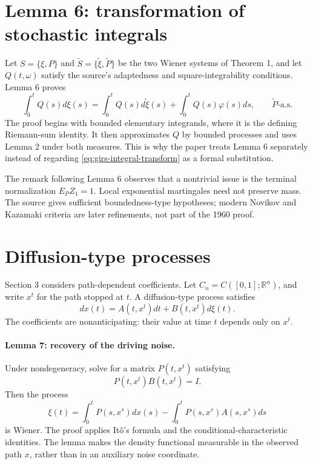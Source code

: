 \section{Lemma 6: transformation of stochastic integrals}
Let \(S=\{\xi,P\}\) and \(\widetilde S=\{\widetilde\xi,\widetilde P\}\) be the two Wiener systems of
Theorem 1, and let \(Q(t,\omega)\) satisfy the source's adaptedness and square-integrability
conditions.  Lemma 6 proves
\begin{equation}\label{eq:girs-integral-transform}
 \int_0^tQ(s)d\xi(s)
 =\int_0^tQ(s)d\widetilde\xi(s)+
   \int_0^tQ(s)\varphi(s)ds,
 \qquad \widetilde P\text{-a.s.}
\end{equation}
The proof begins with bounded elementary integrands, where it is the defining Riemann-sum identity.
It then approximates \(Q\) by bounded processes and uses Lemma 2 under both measures.  This is why
the paper treats Lemma 6 separately instead of regarding \eqref{eq:girs-integral-transform} as a
formal substitution.

The remark following Lemma 6 observes that a nontrivial issue is the terminal normalization
\(E_PZ_1=1\).  Local exponential martingales need not preserve mass.  The source gives sufficient
boundedness-type hypotheses; modern Novikov and Kazamaki criteria are later refinements, not part of
the 1960 proof.

\section{Diffusion-type processes}
Section 3 considers path-dependent coefficients.  Let \(C_n=C([0,1];\mathbb R^n)\), and write
\(x^t\) for the path stopped at \(t\).  A diffusion-type process satisfies
\begin{equation}\label{eq:girs-path-sde}
 dx(t)=A(t,x^t)dt+B(t,x^t)d\xi(t).
\end{equation}
The coefficients are nonanticipating: their value at time \(t\) depends only on \(x^t\).

\paragraph{Lemma 7: recovery of the driving noise.}
Under nondegeneracy, solve for a matrix \(P(t,x^t)\) satisfying
\[
 P(t,x^t)B(t,x^t)=I.
\]
Then the process
\begin{equation}\label{eq:girs-recovered-noise}
 \xi(t)=\int_0^tP(s,x^s)dx(s)-
        \int_0^tP(s,x^s)A(s,x^s)ds
\end{equation}
is Wiener.  The proof applies It\^o's formula and the conditional-characteristic identities.  The
lemma makes the density functional measurable in the observed path \(x\), rather than in an
auxiliary noise coordinate.


